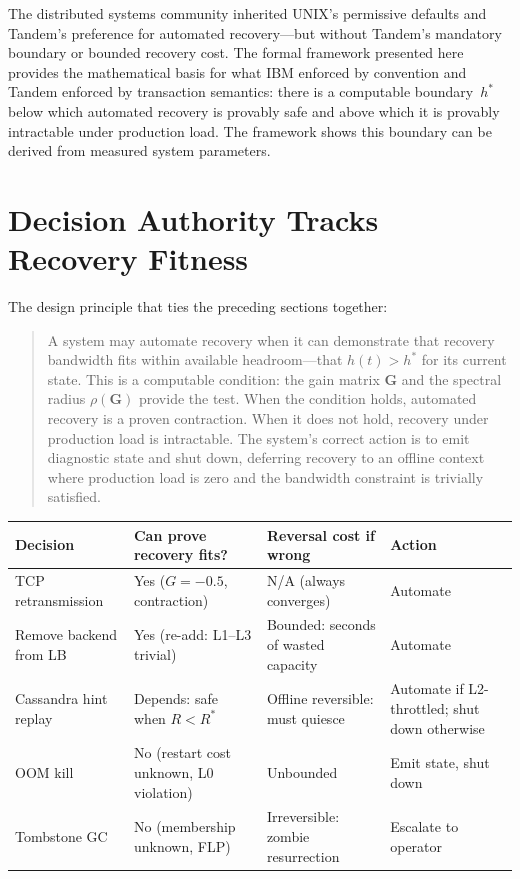\documentclass[11pt]{article}
\begin{document}
The distributed systems community inherited UNIX's permissive defaults
and Tandem's preference for automated recovery---but without Tandem's
mandatory boundary or bounded recovery cost. The formal framework
presented here provides the mathematical basis for what IBM enforced by
convention and Tandem enforced by transaction semantics: there is a
computable boundary~$h^*$ below which automated recovery is provably safe
and above which it is provably intractable under production load. The
framework shows this boundary can be derived from measured system
parameters.

\section{Decision Authority Tracks Recovery Fitness}

The design principle that ties the preceding sections together:

\begin{quote}
A system may automate recovery when it can demonstrate that recovery bandwidth
fits within available headroom---that $h(t) > h^*$ for its current state. This
is a computable condition: the gain matrix $\mathbf{G}$ and the spectral radius
$\rho(\mathbf{G})$ provide the test. When the condition holds, automated
recovery is a proven contraction. When it does not hold, recovery under
production load is intractable. The system's correct action is to emit
diagnostic state and shut down, deferring recovery to an offline context where
production load is zero and the bandwidth constraint is trivially satisfied.
\end{quote}

\begin{small}
\noindent\begin{tabularx}{\textwidth}{@{}lXXl@{}}
\toprule
Decision & Can prove recovery fits? & Reversal cost if wrong & Action \\
\midrule
TCP retransmission & Yes ($G = -0.5$, contraction) & N/A (always converges) & Automate \\
Remove backend from LB & Yes (re-add: L1--L3 trivial) & Bounded: seconds of wasted capacity & Automate \\
Cassandra hint replay & Depends: safe when $R < R^*$ & Offline reversible: must quiesce & Automate if L2-throttled; shut down otherwise \\
OOM kill & No (restart cost unknown, L0 violation) & Unbounded & Emit state, shut down \\
Tombstone GC & No (membership unknown, FLP) & Irreversible: zombie resurrection & Escalate to operator \\
\bottomrule
\end{tabularx}
\end{small}
\end{document}
